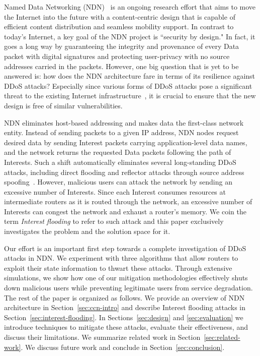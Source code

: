 \documentclass[10pt,conference]{IEEEtran}
\begin{document}
Named Data Networking (NDN)~\cite{ndn-conext, ndn-tr} is an ongoing research effort that aims to move the Internet into the future with a content-centric design that is capable of efficient content distribution and seamless mobility support. In contrast to today's Internet, a key goal of the NDN project is ``security by design." In fact, it goes a long way by guaranteeing the integrity and provenance of every Data packet with digital signatures and protecting user-privacy with no source addresses carried in the packets. However, one big question that is yet to be answered is: how does the NDN architecture fare in terms of its resilience against DDoS attacks? Especially since various forms of DDoS attacks pose a significant threat to the existing Internet infrastructure~\cite{arbor-report}, it is crucial to ensure that the new design is free of similar vulnerabilities.

NDN eliminates host-based addressing and makes data the first-class network entity. Instead of sending packets to a given IP address, NDN nodes request desired data by sending Interest packets carrying application-level data names, and the network returns the requested Data packets following the path of Interests. 
Such a shift automatically eliminates several long-standing DDoS attacks, including direct flooding and reflector attacks through source address spoofing~\cite{mirkovic2004taxonomy}.
%
However, malicious users can attack the network by sending an excessive number of Interests. 
Since each Interest consumes resources at intermediate routers as it is routed through the network, an excessive number of Interests can congest the network and exhaust a router's memory. 
We coin the term {\it Interest flooding} to refer to such attack and
this paper exclusively investigates the problem and the solution space for it. 

Our effort is an important first step towards a complete investigation of DDoS attacks in NDN. We experiment with three algorithms that allow routers to exploit their state information to thwart these attacks. Through extensive simulations, we show how one of our mitigation methodologies effectively shuts down malicious users while preventing legitimate users from service degradation. 
The rest of the paper is organized as follows. We provide an overview of NDN architecture in Section~\ref{sec:ccn-intro} and describe Interest flooding attacks in Section~\ref{sec:interest-flooding}. In Sections~\ref{sec:design} and \ref{sec:evaluation} we introduce techniques to mitigate these attacks, evaluate their effectiveness, and discuss their limitations. We summarize related work in Section~\ref{sec:related-work}. We discuss future work and conclude in Section~\ref{sec:conclusion}. 
\end{document}

